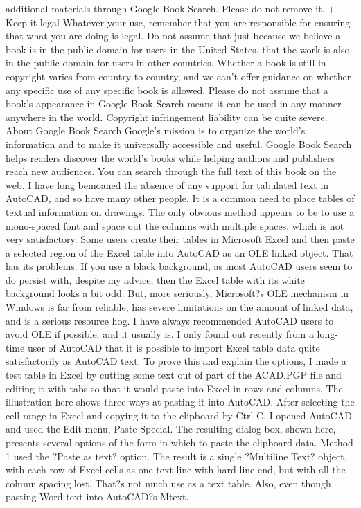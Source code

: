 \documentclass[a4paper]{article}
\begin{document}
additional materials through Google Book Search. Please do not remove it. 
+ Keep it legal Whatever your use, remember that you are responsible for ensuring that what you are doing is legal. Do not assume that just 
because we believe a book is in the public domain for users in the United States, that the work is also in the public domain for users in other 
countries. Whether a book is still in copyright varies from country to country, and we can't offer guidance on whether any specific use of 
any specific book is allowed. Please do not assume that a book's appearance in Google Book Search means it can be used in any manner 
anywhere in the world. Copyright infringement liability can be quite severe. 
About Google Book Search 
Google's mission is to organize the world's information and to make it universally accessible and useful. Google Book Search helps readers 
discover the world's books while helping authors and publishers reach new audiences. You can search through the full text of this book on the web. I have long bemoaned the absence of any support for tabulated text in AutoCAD, and so have many other people. It is a common need to place tables of textual information on drawings. The only obvious method appears to be to use a mono-spaced font and space out the columns with multiple spaces, which is not very satisfactory.
Some users create their tables in Microsoft Excel and then paste a selected region of the Excel table into AutoCAD as an OLE linked object. That has its problems. If you use a black background, as most AutoCAD users seem to do persist with, despite my advice, then the Excel table with its white background looks a bit odd. But, more seriously, Microsoft?s OLE mechanism in Windows is far from reliable, has severe limitations on the amount of linked data, and is a serious resource hog. I have always recommended AutoCAD users to avoid OLE if possible, and it usually is.
I only found out recently from a long-time user of AutoCAD that it is possible to import Excel table data quite satisfactorily as AutoCAD text. To prove this and explain the options, I made a test table in Excel by cutting some text out of part of the ACAD.PGP file and editing it with tabs so that it would paste into Excel in rows and columns. The illustration here shows three ways at pasting it into AutoCAD. After selecting the cell range in Excel and copying it to the clipboard by Ctrl-C, I opened AutoCAD and used the Edit menu, Paste Special. The resulting dialog box, shown here, presents several options of the form in which to paste the clipboard data.
Method 1 used the ?Paste as text? option. The result is a single ?Multiline Text? object, with each row of Excel cells as one text line with hard line-end, but with all the column spacing lost. That?s not much use as a text table. Also, even though pasting Word text into AutoCAD?s Mtext.
\end{document}
